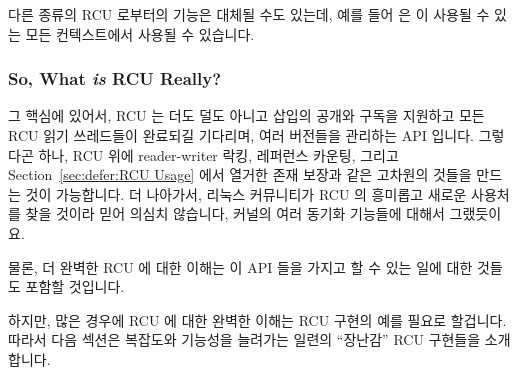 다른 종류의 RCU 로부터의 기능은 대체될 수도 있는데, 예를 들어
 은  이 사용될 수 있는 모든
컨텍스트에서 사용될 수 있습니다.
\iffalse

Figure~\ref{fig:defer:RCU API Usage Constraints}
shows which APIs may be used in which in-kernel environments.
The RCU read-side primitives may be used in any environment, including NMI,
the RCU mutation and asynchronous grace-period primitives may be used in any
environment other than NMI, and, finally, the RCU synchronous grace-period
primitives may be used only in process context.
The RCU list-traversal primitives include \co{list_for_each_entry_rcu()},
\co{hlist_for_each_entry_rcu()}, etc.
Similarly, the RCU list-mutation primitives include
\co{list_add_rcu()}, \co{hlist_del_rcu()}, etc.

Note that primitives from other families of RCU may be substituted,
for example, \co{srcu_read_lock()} may be used in any context
in which \co{rcu_read_lock()} may be used.
\fi

\subsubsection{So, What \emph{is} RCU Really?}
\label{sec:defer:So, What is RCU Really?}

그 핵심에 있어서, RCU 는 더도 덜도 아니고 삽입의 공개와 구독을 지원하고 모든
RCU 읽기 쓰레드들이 완료되길 기다리며, 여러 버전들을 관리하는 API 입니다.
그렇다곤 하나, RCU 위에 reader-writer 락킹, 레퍼런스 카운팅, 그리고
Section~\ref{sec:defer:RCU Usage} 에서 열거한 존재 보장과 같은 고차원의 것들을
만드는 것이 가능합니다.
더 나아가서, 리눅스 커뮤니티가 RCU 의 흥미롭고 새로운 사용처를 찾을 것이라 믿어
의심치 않습니다, 커널의 여러 동기화 기능들에 대해서 그랬듯이요.

물론, 더 완벽한 RCU 에 대한 이해는 이 API 들을 가지고 할 수 있는 일에 대한
것들도 포함할 것입니다.

하지만, 많은 경우에 RCU 에 대한 완벽한 이해는 RCU 구현의 예를 필요로 할겁니다.
따라서 다음 섹션은 복잡도와 기능성을 늘려가는 일련의 ``장난감'' RCU 구현들을
소개합니다.
\iffalse

At its core, RCU is nothing more nor less than an API that supports
publication and subscription for insertions, waiting for all RCU readers
to complete, and maintenance of multiple versions.
That said, it is possible to build higher-level constructs
on top of RCU, including the reader-writer-locking, reference-counting,
and existence-guarantee constructs listed in
Section~\ref{sec:defer:RCU Usage}.
Furthermore, I have no doubt that the Linux community will continue to
find interesting new uses for RCU,
just as they do for any of a number of synchronization
primitives throughout the kernel.

Of course, a more-complete view of RCU would also include
all of the things you can do with these APIs.

However, for many people, a complete view of RCU must include sample
RCU implementations.
The next section therefore presents a series of ``toy'' RCU implementations
of increasing complexity and capability.
\fi
